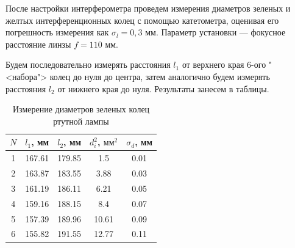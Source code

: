 \documentclass[12pt]{kiarticle}
\begin{document}
		После настройки интерферометра проведем измерения диаметров зеленых и желтых интерференционных колец с помощью катетометра, оценивая его погрешность измерения как $ \sigma_l = 0,3 $ мм. Параметр установки --- фокусное расстояние линзы $ f = 110 $ мм.
		
		Будем последовательно измерять расстояния $ l_1 $ от верхнего края 6-ого "<набора"> колец до нуля до центра, затем аналогично будем измерять расстояния $ l_2 $ от нижнего края до нуля. Результаты занесем в таблицы. 
		
			\begin{table}[]
			\caption{Измерение диаметров зеленых колец ртутной лампы}
			\begin{center}
				\begin{tabular}{|c|c|c|c|c|}
					\hline
					$ N $ & $ l_1 $, мм & $ l_2 $, мм & $ d_i^2 $, $ мм^2 $ & $ \sigma_d $, мм\\
					\hline
					 1 & 167.61 & 179.85 & 1.5 & 0.01 \\
					2 & 163.87 & 183.55 & 3.88 & 0.03 \\
					3 & 161.19 & 186.11 & 6.21 & 0.05 \\
					4 & 159.16 & 188.15 & 8.4 & 0.07 \\
					5 & 157.39 & 189.96 & 10.61 & 0.09 \\
					6 & 155.82 & 191.55 & 12.77 & 0.11 \\
					\hline
				\end{tabular}
			\end{center}
			\label{Gr_table}
		\end{table}
	
\end{document}
